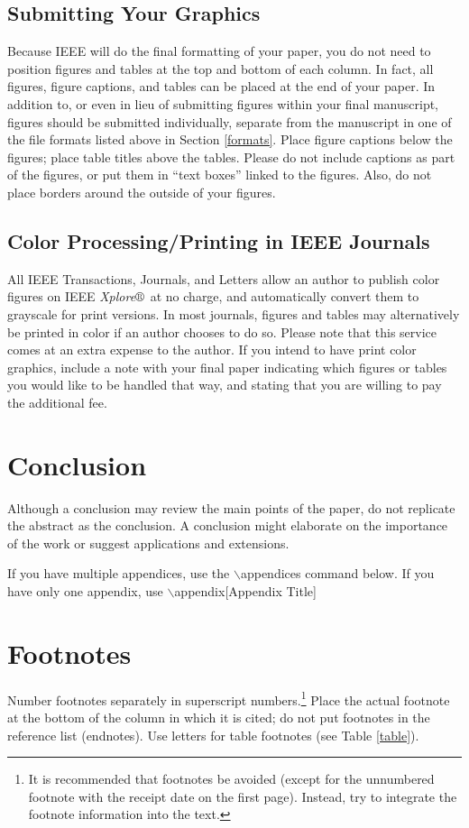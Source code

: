 \documentclass{ieeeaccess}
\begin{document}
\subsection{Submitting Your Graphics}
Because IEEE will do the final formatting of your paper,
you do not need to position figures and tables at the top and bottom of each
column. In fact, all figures, figure captions, and tables can be placed at
the end of your paper. In addition to, or even in lieu of submitting figures
within your final manuscript, figures should be submitted individually,
separate from the manuscript in one of the file formats listed above in
Section \ref{formats}. Place figure captions below the figures; place table titles
above the tables. Please do not include captions as part of the figures, or
put them in ``text boxes'' linked to the figures. Also, do not place borders
around the outside of your figures.

\subsection{Color Processing/Printing in IEEE Journals}
All IEEE Transactions, Journals, and Letters allow an author to publish
color figures on IEEE {\it Xplore}$\circledR$\ at no charge, and automatically
convert them to grayscale for print versions. In most journals, figures and
tables may alternatively be printed in color if an author chooses to do so.
Please note that this service comes at an extra expense to the author. If
you intend to have print color graphics, include a note with your final
paper indicating which figures or tables you would like to be handled that
way, and stating that you are willing to pay the additional fee.

\section{Conclusion}
Although a conclusion may review the  main points of the paper, do not replicate the abstract as the conclusion. A
conclusion might elaborate on the importance of the work or suggest
applications and extensions.

If you have multiple appendices, use the $\backslash$appendices command below. If you have only one appendix, use
$\backslash$appendix[Appendix Title]

\appendices
\section{\break Footnotes}
Number footnotes separately in superscript numbers.\footnote{It is recommended that footnotes be avoided (except for
the unnumbered footnote with the receipt date on the first page). Instead,
try to integrate the footnote information into the text.} Place the actual
footnote at the bottom of the column in which it is cited; do not put
footnotes in the reference list (endnotes). Use letters for table footnotes
(see Table \ref{table}).
\end{document}
